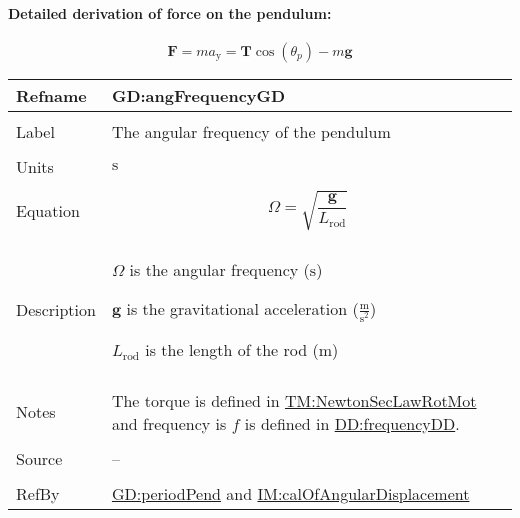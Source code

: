\documentclass[12pt]{article}
\begin{document}
\paragraph{Detailed derivation of force on the pendulum:}
\label{GD:vForceOnPendulumDeriv}
\begin{displaymath}
\symbf{F}=m {a_{\text{y}}}=\symbf{T} \cos\left({θ_{p}}\right)-m \symbf{g}
\end{displaymath}
\vspace{\baselineskip}
\noindent
\begin{minipage}{\textwidth}
\begin{tabular}{>{\raggedright}p{}>{\raggedright\arraybackslash}p{}}
\toprule \textbf{Refname} & \textbf{GD:angFrequencyGD}
\label{GD:angFrequencyGD}
\\ \midrule \\
Label & The angular frequency of the pendulum
        
\\ \midrule \\
Units & ${\text{s}}$
        
\\ \midrule \\
Equation & \begin{displaymath}
           Ω=\sqrt{\frac{\symbf{g}}{{L_{\text{rod}}}}}
           \end{displaymath}
\\ \midrule \\
Description & \begin{symbDescription}
              \item{$Ω$ is the angular frequency (${\text{s}}$)}
              \item{$\symbf{g}$ is the gravitational acceleration ($\frac{\text{m}}{\text{s}^{2}}$)}
              \item{${L_{\text{rod}}}$ is the length of the rod (${\text{m}}$)}
              \end{symbDescription}
\\ \midrule \\
Notes & The torque is defined in \hyperref[TM:NewtonSecLawRotMot]{TM:NewtonSecLawRotMot} and frequency is $f$ is defined in \hyperref[DD:frequencyDD]{DD:frequencyDD}.
        
\\ \midrule \\
Source & --
         
\\ \midrule \\
RefBy & \hyperref[GD:periodPend]{GD:periodPend} and \hyperref[IM:calOfAngularDisplacement]{IM:calOfAngularDisplacement}
        
\\ \bottomrule
\end{tabular}
\end{minipage}
\end{document}

